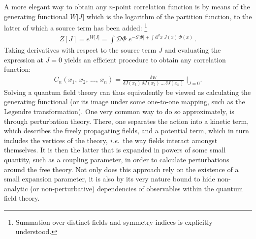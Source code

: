\documentclass[11pt]{book}
\newcommand\ie{\textit{i.e.}\ }
\numberwithin{equation}{chapter}
\begin{document}
A more elegant way to obtain any $n$-point correlation function is
by means of the generating functional $W \lbrack J \rbrack$
which is the logarithm of the partition function, to the latter of which
a source term
has been added:%
\footnote{%
  Summation over distinct fields and symmetry indices is explicitly
  understood.
}
\begin{align}
  Z[J] =
  e^{ W \lbrack J \rbrack }
  = \int \mathcal D \Phi \;
  e^{
    - S \lbrack \Phi \rbrack
    + \int \mathrm d^dx \; J(x) \, \Phi(x)
  } \,.
  \label{eq:modpartitionfct}
\end{align}
Taking derivatives with respect to the source term $J$ and evaluating
the expression at $J=0$ yields an efficient procedure to obtain
any correlation function:
\begin{align}
  C_n(x_1, \, x_2,\, \dots, \, x_n) =
  \frac{ \delta W }{ \delta J(x_1) \, \delta J(x_2) \, \dots \, \delta J(x_n) }
  \; \bigg|_{J=0} .
\end{align}
Solving a quantum field theory can
thus equivalently be viewed as calculating the generating functional
(or its image under some one-to-one mapping, such as the
Legendre transformation).
One very common way to do so approximately, is through perturbation
theory. There, one separates the action into a kinetic term, which
describes the freely propagating fields, and a potential term,
which in turn includes the vertices of the theory, \ie the way fields
interact amongst themselves. It is then the latter that is expanded
in powers of some small quantity, such as a coupling parameter,
in order to calculate perturbations around the free theory.
Not only does this approach rely on the existence of a small expansion
parameter, it is also by its very nature bound to hide non-analytic
(or non-perturbative) dependencies of observables within the quantum field theory.
\end{document}
